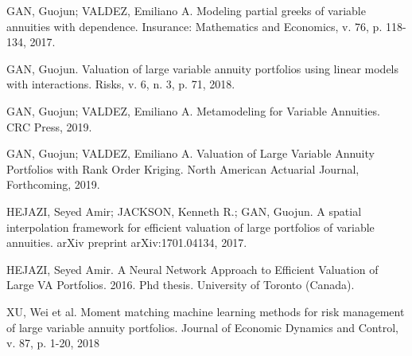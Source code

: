 \documentclass[preprint,authoryear,11pt]{report}
\theoremstyle{definition}
\begin{document}
GAN, Guojun; VALDEZ, Emiliano A. Modeling partial greeks of variable annuities with dependence. Insurance: Mathematics and Economics, v. 76, p. 118-134, 2017.

GAN, Guojun. Valuation of large variable annuity portfolios using linear models with interactions. Risks, v. 6, n. 3, p. 71, 2018.

GAN, Guojun; VALDEZ, Emiliano A. Metamodeling for Variable Annuities. CRC Press, 2019.

GAN, Guojun; VALDEZ, Emiliano A. Valuation of Large Variable Annuity Portfolios with Rank Order Kriging. North American Actuarial Journal, Forthcoming, 2019.

HEJAZI, Seyed Amir; JACKSON, Kenneth R.; GAN, Guojun. A spatial interpolation framework for efficient valuation of large portfolios of variable annuities. arXiv preprint arXiv:1701.04134, 2017.

HEJAZI, Seyed Amir. A Neural Network Approach to Efficient Valuation of Large VA Portfolios. 2016. Phd thesis. University of Toronto (Canada).

XU, Wei et al. Moment matching machine learning methods for risk management of large variable annuity portfolios. Journal of Economic Dynamics and Control, v. 87, p. 1-20, 2018  
	\newpage
\end{document}
